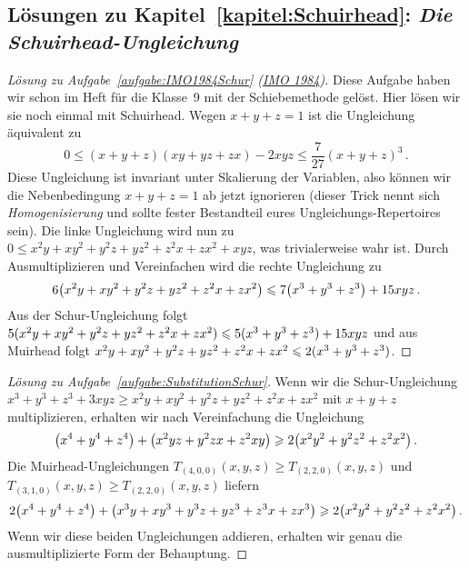 \subsection*{Lösungen zu Kapitel~\ref{kapitel:Schuirhead}: \emph{Die Schuirhead-Ungleichung}}
\begin{proof}[Lösung zu Aufgabe~\ref{aufgabe:IMO1984Schur} \textmd{(\href{https://www.imo-official.org/problems.aspx}{IMO 1984})}]
	Diese Aufgabe haben wir schon im Heft für die Klasse~9 mit der Schiebemethode gelöst. Hier lösen wir sie noch einmal mit Schuirhead. Wegen $x+y+z=1$ ist die Ungleichung äquivalent zu
	\begin{equation*}
		0\leqslant (x+y+z)(xy+yz+zx)-2xyz\leqslant\frac{7}{27}(x+y+z)^3\,.
	\end{equation*}
	Diese Ungleichung ist invariant unter Skalierung der Variablen, also können wir die Nebenbedingung $x+y+z=1$ ab jetzt ignorieren (dieser Trick nennt sich \emph{Homogenisierung} und sollte fester Bestandteil eures Ungleichungs-Repertoires sein). Die linke Ungleichung wird nun zu $0\leqslant x^2y+xy^2+y^2z+yz^2+z^2x+zx^2+xyz$, was trivialerweise wahr ist. Durch Ausmultiplizieren und Vereinfachen wird die rechte Ungleichung zu
	\begin{equation*}
		6\parens*{x^2y+xy^2+y^2z+yz^2+z^2x+zx^2}\leqslant 7\parens*{x^3+y^3+z^3}+15xyz\,.
	\end{equation*}
	Aus der Schur-Ungleichung folgt $5\lparen x^2y+xy^2+y^2z+yz^2+z^2x+zx^2\rparen\leqslant 5\lparen x^3+y^3+z^3\rparen+15xyz$ und aus Muirhead folgt $x^2y+xy^2+y^2z+yz^2+z^2x+zx^2\leqslant 2\lparen x^3+y^3+z^3\rparen$.
\end{proof}

\begin{proof}[Lösung zu Aufgabe~\ref{aufgabe:SubstitutionSchur}]
	Wenn wir die Schur-Ungleichung $x^3+y^3+z^3+3xyz\geqslant x^2y+xy^2+y^2z+yz^2+z^2x+zx^2$ mit $x+y+z$ multiplizieren, erhalten wir nach Vereinfachung die Ungleichung
	\begin{equation*}
		\parens*{x^4+y^4+z^4}+\parens*{x^2yz+y^2zx+z^2xy}\geqslant 2\parens*{x^2y^2+y^2z^2+z^2x^2}\,.
	\end{equation*}
	Die Muirhead-Ungleichungen $T_{(4,0,0)}(x,y,z)\geqslant T_{(2,2,0)}(x,y,z)$ und $T_{(3,1,0)}(x,y,z)\geqslant T_{(2,2,0)}(x,y,z)$ liefern
	\begin{equation*}
		2\parens*{x^4+y^4+z^4}+\parens*{x^3y+xy^3+y^3z+yz^3+z^3x+zx^3}\geqslant 2\parens*{x^2y^2+y^2z^2+z^2x^2}\,.
	\end{equation*}
	Wenn wir diese beiden Ungleichungen addieren, erhalten wir genau die ausmultiplizierte Form der Behauptung.
\end{proof}